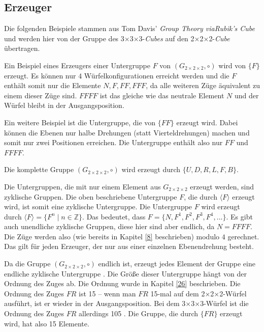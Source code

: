 \documentclass[12pt,a4paper, usenames, dvipsnames]{article}
\newcommand{\Gtwo}{\ensuremath{G_{2\times 2\times 2}}}
\newcommand{\Ttwo}{2$\times$2$\times$2-}
\newcommand{\Tthree}{3$\times$3$\times$3-}
\begin{document}
%
%
%
%
%
%
%
%
%
%
%
%
%
%
%
%
%
%
%
%

\subsection*{Erzeuger}

Die folgenden Beispiele stammen aus Tom Davis' \textit{Group Theory viaRubik's Cube} \cite{TD} und werden hier von der Gruppe des \Tthree \textit{Cubes} auf den \Ttwo \textit{Cube} übertragen.


Ein Beispiel eines Erzeugers einer Untergruppe $F$ von $(\Gtwo, \circ)$ wird von $\{ F \}$ erzeugt. Es können nur $4$ Würfelkonfigurationen erreicht werden und die $F$ enthält somit nur die Elemente ${N, F, FF, FFF}$, da alle weiteren Züge äquivalent zu einem dieser Züge sind. $FFFF$ ist das gleiche wie das neutrale Element $N$ und der Würfel bleibt in der Ausgangsposition.


Ein weitere Beispiel ist die Untergruppe, die von $\{FF\}$ erzeugt wird. Dabei können die Ebenen nur halbe Drehungen (statt Vierteldrehungen) machen und somit nur zwei Positionen erreichen. Die Untergruppe enthält also nur $FF$ und $FFFF$.


Die komplette Gruppe $(\Gtwo, \circ)$ wird erzeugt durch $\{U, D, R, L, F, B\}$.

Die Untergruppen, die mit nur einem Element aus $\Gtwo$ erzeugt werden, sind zyklische Gruppen. Die oben beschriebene Untergruppe $F$, die durch $\langle F \rangle$ erzeugt wird, ist somit eine zyklische Untergruppe.
Die Untergruppe $F$ wird erzeugt durch $\langle F \rangle = \{ F^n \mid n \in \mathbb{Z}\}$. Das bedeutet, dass $F = \{N, F^1, F^2, F^3, F^4, ...\}$. Es gibt auch unendliche zyklische Gruppen, diese hier sind aber endlich, da $N = FFFF$. Die Züge werden also (wie bereits in Kapitel \ref{8} beschrieben) modulo $4$ gerechnet.
Das gilt für jeden Erzeuger, der nur aus einer einzelnen Ebenendrehung besteht.


Da die Gruppe $(\Gtwo, \circ)$ endlich ist, erzeugt jedes Element der Gruppe eine endliche zyklische Untergruppe \cite{TD}. Die Größe dieser Untergruppe hängt von der Ordnung des Zuges ab. Die Ordnung wurde in Kapitel \ref{26} beschrieben.
Die Ordnung des Zuges $FR$ ist 15 -- wenn man $FR$ 15-mal auf dem \Ttwo Würfel ausführt, ist er wieder in der Ausgangsposition. Bei dem \Tthree Würfel ist die Ordnung des Zuges $FR$ allerdings 105 \cite{TD}.
Die Gruppe, die durch $\{FR\}$ erzeugt wird, hat also 15 Elemente.
%
%
%
%
%
%
%
%
%
%
%
%
%
%
%
%
%
%
%
\end{document}
